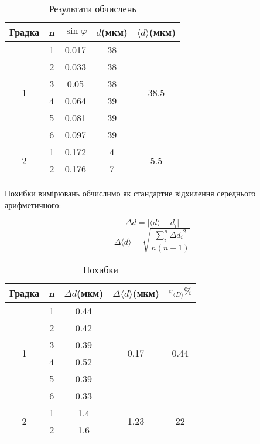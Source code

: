\begin{table}[h]
    \centering
    \begin{tabular}{|c|c|c|c|c|}
        \hline
        \textbf{Градка} & \textbf{n} & $\sin{\varphi}$ & $d$\textbf{(мкм)} & $\langle d \rangle$\textbf{(мкм)} \\        
        \hline
        \multirow{6}{*}{1} & 1 & 0.017  & 38 & \multirow{6}{*}{38.5} \\
        \cline{2-4}
         & 2 & 0.033 & 38  & \\         	                                        
        \cline{2-4}
        & 3 & 0.05 & 38 &\\
        \cline{2-4}
        & 4 & 0.064 & 39 &\\
        \cline{2-4}
        & 5 & 0.081 & 39 &\\
        \cline{2-4}
        & 6 & 0.097 & 39 &\\
        \hline

        \multirow{2}{*}{2} & 1 & 0.172 & 4 & \multirow{2}{*}{5.5} \\        
        \cline{2-4}
        & 2 & 0.176 & 7  &\\
        \hline
    \end{tabular}

    \caption{Результати обчислень}
\end{table}

Похибки вимірювань обчислимо як стандартне відхилення
середнього арифметичного:

$$ \Delta d = |\langle d \rangle - d_i| $$
$$ \Delta \langle d \rangle = \sqrt{\frac{\sum\limits_{i}^{n} {\Delta d_i}^2}{n(n-1)}} $$

\begin{table}[h]
    \centering
    \begin{tabular}{|c|c|c|c|c|}
        \hline
        \textbf{Градка} & \textbf{n} & $\Delta d$\textbf{(мкм)} & $\Delta \langle d \rangle$\textbf{(мкм)} & $\varepsilon_{\langle D \rangle}\% $ \\        
        \hline
        \multirow{6}{*}{1} & 1 & 0.44  & \multirow{6}{*}{0.17} & \multirow{6}{*}{0.44} \\
        \cline{2-3} 
         & 2 & 0.42 &   & \\         	                                        
         \cline{2-3} 
        & 3 & 0.39 &  &\\
        \cline{2-3} 
        & 4 & 0.52 &  &\\
        \cline{2-3} 
        & 5 & 0.39 &  &\\
        \cline{2-3} 
        & 6 & 0.33 &  &\\
        \hline

        \multirow{2}{*}{2} & 1 & 1.4 & \multirow{2}{*}{1.23} & \multirow{2}{*}{22} \\
        \cline{2-3} 
        & 2 & 1.6 &   &\\
        \hline
    \end{tabular}

    \caption{Похибки}
\end{table}

